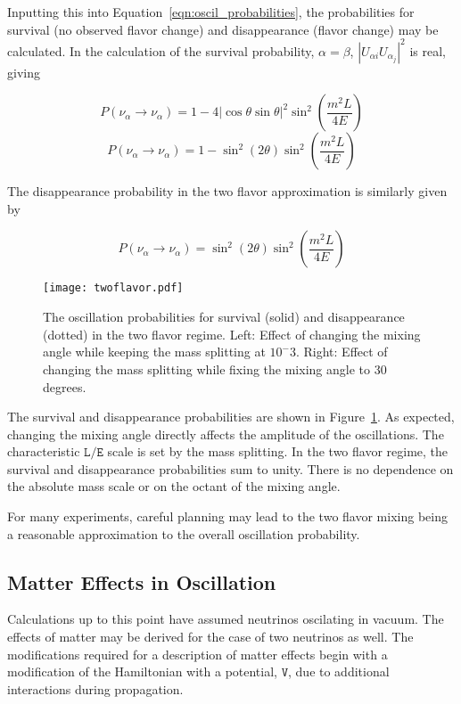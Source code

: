Inputting this into Equation~\ref{eqn:oscil_probabilities}, the probabilities for survival (no observed flavor change) and disappearance (flavor change) may be calculated.
In the calculation of the survival probability, $\mathtt{\alpha = \beta}$, $\left| U_{\alpha i} U_{\alpha_j}\right|^2$ is real, giving

\begin{equation}
P\left(\nu_\alpha\rightarrow\nu_\alpha\right) = 1 - 4 \left| \cos\theta \sin \theta \right|^2 \sin^2\left(\frac{m^2 L}{4E}\right)
\end{equation}
\begin{equation}
P\left(\nu_\alpha\rightarrow\nu_\alpha\right) = 1 - \sin^2 \left(2\theta\right) \sin^2\left(\frac{m^2 L}{4E}\right)
\end{equation}

The disappearance probability in the two flavor approximation is similarly given by 

\begin{equation}
P\left(\nu_\alpha\rightarrow\nu_\alpha\right) = \sin^2 \left(2\theta\right) \sin^2\left(\frac{m^2 L}{4E}\right)
\label{eqn:two_flavor_disappearance}
\end{equation}

\begin{figure}
\centering
\texttt{[image: twoflavor.pdf]}
\label{fig:twoflavor_probs}
\caption{The oscillation probabilities for survival (solid) and disappearance (dotted) in the two flavor regime. Left: Effect of changing the mixing angle while keeping the mass splitting at $10^-3$. Right: Effect of changing the mass splitting while fixing the mixing angle to 30 degrees.}
\end{figure}

The survival and disappearance probabilities are shown in Figure~\ref{fig:twoflavor_probs}.
As expected, changing the mixing angle directly affects the amplitude of the oscillations.
The characteristic $\texttt{L/E}$ scale is set by the mass splitting.
In the two flavor regime, the survival and disappearance probabilities sum to unity.
There is no dependence on the absolute mass scale or on the octant of the mixing angle.

For many experiments, careful planning may lead to the two flavor mixing being a reasonable approximation to the overall oscillation probability.


\label{subsec:msw}
\subsection{Matter Effects in Oscillation}
Calculations up to this point have assumed neutrinos oscilating in vacuum.
The effects of matter may be derived for the case of two neutrinos as well.
The modifications required for a description of matter effects begin with a modification of the Hamiltonian with a potential, $\mathtt{V}$, due to additional interactions during propagation.

